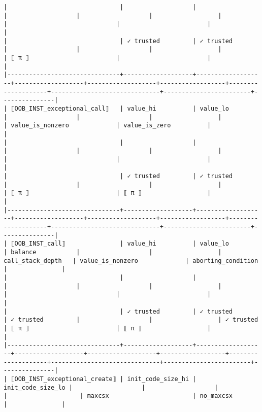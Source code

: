 \documentclass[varwidth=\maxdimen,margin=0.5cm,multi={verbatim}]{standalone}
\begin{document}
\begin{verbatim}
|                               |                   |                   |                   |                   |                  |                    |                              |                        |               |
|                               | ✓ trusted         | ✓ trusted         |                   |                   |                  |                    | ⟦ π ⟧                        |                        |               |
|-------------------------------+-------------------+-------------------+-------------------+-------------------+------------------+--------------------+------------------------------+------------------------+---------------|
| ⟦OOB_INST_exceptional_call⟧   | value_hi          | value_lo          |                   |                   |                  |                    | value_is_nonzero             | value_is_zero          |               |
|                               |                   |                   |                   |                   |                  |                    |                              |                        |               |
|                               | ✓ trusted         | ✓ trusted         |                   |                   |                  |                    | ⟦ π ⟧                        | ⟦ π ⟧                  |               |
|-------------------------------+-------------------+-------------------+-------------------+-------------------+------------------+--------------------+------------------------------+------------------------+---------------|
| ⟦OOB_INST_call⟧               | value_hi          | value_lo          | balance           |                   |                  | call_stack_depth   | value_is_nonzero             | aborting_condition     |               |
|                               |                   |                   |                   |                   |                  |                    |                              |                        |               |
|                               | ✓ trusted         | ✓ trusted         | ✓ trusted         |                   |                  | ✓ trusted          | ⟦ π ⟧                        | ⟦ π ⟧                  |               |
|-------------------------------+-------------------+-------------------+-------------------+-------------------+------------------+--------------------+------------------------------+------------------------+---------------|
| ⟦OOB_INST_exceptional_create⟧ | init_code_size_hi | init_code_size_lo |                   |                   |                  |                    | maxcsx                       | no_maxcsx              |               |

\end{verbatim}
\end{document}
